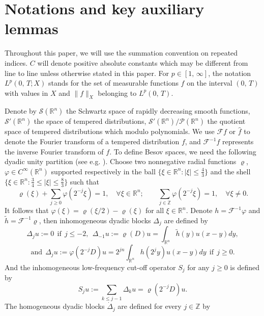 \documentclass[11pt]{article}
\theoremstyle{plain}\newtheorem{definition}{Definition}[section]
\theoremstyle{definition}\newtheorem{theorem}{Theorem}[section]
\theoremstyle{plain}\newtheorem{lemma}[theorem]{Lemma}
\theoremstyle{plain}\newtheorem{coro}[theorem]{Corollary}
\theoremstyle{plain}\newtheorem{prop}[theorem]{Proposition}
\theoremstyle{remark}\newtheorem{remark}{Remark}[section]
\numberwithin{equation}{section}
\begin{document}
\section{Notations and  key auxiliary lemmas} \label{section2}



Throughout this paper, we will use the summation convention on repeated indices. $C$ will denote positive absolute constants which may be different from line to line unless otherwise stated in this paper.  For $p\in [1,\,\infty]$, the notation $L^{p}(0,\,T;X)$ stands for the set of measurable functions $f$ on the interval $(0,\,T)$ with values in $X$ and $\|f\|_{X}$ belonging to $L^{p}(0,\,T)$.






Denote by
$\mathcal{S}(\mathbb{R}^{n})$ the Schwartz space of rapidly
decreasing smooth functions, $\mathcal{S}'(\mathbb{R}^{n})$ the
space of tempered distributions,
$\mathcal{S}'(\mathbb{R}^{n})/\mathcal{P}(\mathbb{R}^{n})$ the
quotient space of tempered distributions which modulo polynomials.
We use $\mathcal{F}f$ or $\widehat{f}$ to denote the Fourier transform of a tempered distribution $f$, and $\mathcal{F}^{-1}f$ represents the inverse Fourier transform of $f$.
   To define Besov  spaces, we need the following dyadic unity partition
(see e.g. \cite{[BCD]}). Choose two nonnegative radial
functions $\varrho$, $\varphi\in C^{\infty}(\mathbb{R}^{n})$
supported respectively in the ball $\{\xi\in
\mathbb{R}^{n}:|\xi|\leq \frac{4}{3} \}$ and the shell $\{\xi\in
\mathbb{R}^{n}: \frac{3}{4}\leq |\xi|\leq
  \frac{8}{3} \}$ such that
\begin{equation*}
 \varrho(\xi)+\sum_{j\geq 0}\varphi(2^{-j}\xi)=1, \quad
 \forall\xi\in\mathbb{R}^{n}; \qquad
 \sum_{j\in \mathbb{Z}}\varphi(2^{-j}\xi)=1, \quad \forall\xi\neq 0.
\end{equation*}
It follows that $\varphi(\xi)=\varrho(\xi/2)-\varrho(\xi)$ for all $\xi\in
\mathbb{R}^{n}$. Denote $h=\mathcal{F}^{-1} \varphi $ and $\tilde{h}=\mathcal{F}^{-1}\varrho$, then inhomogeneous dyadic blocks  $\Delta_{j}$ are defined by
$$
\Delta_{j} u:=0 ~~ \text{if} ~~ j \leq-2, ~~ \Delta_{-1} u:=\varrho(D) u =\int_{\mathbb{R}^n}\tilde{h}(y)u(x-y)dy,$$
$$\text{and}~~\Delta_{j} u:=\varphi\left(2^{-j} D\right) u=2^{jn}\int_{\mathbb{R}^n}h(2^{j}y)u(x-y)dy  ~~\text{if}~~ j \geq 0.
$$
And the inhomogeneous low-frequency cut-off operator $S_j$ for any $j \geq 0$ is defined by
$$
S_{j}u:= \sum_{k\leq j-1}\Delta_{k}u=\varrho(2^{-j}D)u.$$
The homogeneous dyadic blocks $\dot{\Delta}_{j}$ are  defined  for every $j\in\mathbb{Z}$ by
\end{document}
